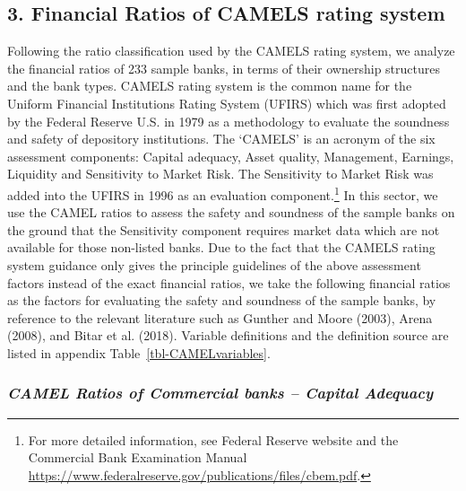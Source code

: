 \documentclass[
  letterpaper,
  DIV=11,
  numbers=noendperiod]{scrreprt}
\begin{document}
\subsection{3. Financial Ratios of CAMELS rating
system}\label{financial-ratios-of-camels-rating-system}

Following the ratio classification used by the CAMELS rating system, we
analyze the financial ratios of 233 sample banks, in terms of their
ownership structures and the bank types. CAMELS rating system is the
common name for the Uniform Financial Institutions Rating System (UFIRS)
which was first adopted by the Federal Reserve U.S. in 1979 as a
methodology to evaluate the soundness and safety of depository
institutions. The `CAMELS' is an acronym of the six assessment
components: Capital adequacy, Asset quality, Management, Earnings,
Liquidity and Sensitivity to Market Risk. The Sensitivity to Market Risk
was added into the UFIRS in 1996 as an evaluation component.\footnote{For
  more detailed information, see Federal Reserve website and the
  Commercial Bank Examination Manual
  \url{https://www.federalreserve.gov/publications/files/cbem.pdf}.} In
this sector, we use the CAMEL ratios to assess the safety and soundness
of the sample banks on the ground that the Sensitivity component
requires market data which are not available for those non-listed banks.
Due to the fact that the CAMELS rating system guidance only gives the
principle guidelines of the above assessment factors instead of the
exact financial ratios, we take the following financial ratios as the
factors for evaluating the safety and soundness of the sample banks, by
reference to the relevant literature such as Gunther and Moore (2003),
Arena (2008), and Bitar et al. (2018). Variable definitions and the
definition source are listed in appendix Table~\ref{tbl-CAMELvariables}.

\subsubsection{\texorpdfstring{\emph{CAMEL Ratios of Commercial banks --
Capital
Adequacy}}{CAMEL Ratios of Commercial banks -- Capital Adequacy}}\label{camel-ratios-of-commercial-banks-capital-adequacy}
\end{document}
